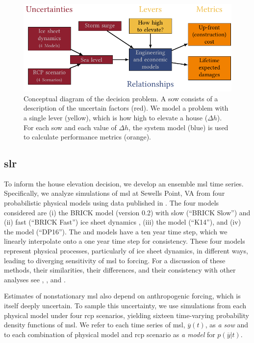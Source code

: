 \documentclass[11pt]{article}
\begin{document}
\begin{figure}
    \centering
    \includegraphics[width=\textwidth]{xlrm.pdf}
    \caption{
        Conceptual diagram of the decision problem.
        A \gls{sow} consists of a description of the uncertain factors (red).
        We model a problem with a single lever (yellow), which is how high to elevate a house ($\Delta h$).
        For each \acrshort{sow} and each value of $\Delta h$, the system model (blue) is used to calculate performance metrics (orange).
    }\label{fig:xlrm}
\end{figure}

\subsection{\gls{slr}}\label{sec:sea-level}

To inform the house elevation decision, we develop an ensemble \gls{msl} time series.
Specifically, we analyze simulations of \gls{msl} at Sewells Point, VA from four probabilistic physical models using data published in \citet{ruckert_coastal:2019}.
The four models considered are (i) the BRICK model (version 0.2) with slow (``BRICK Slow'') and (ii) fast (``BRICK Fast'') ice sheet dynamics \citep{wong_brick0.2:2017}, (iii) the \citet{kopp_probabilistic:2014} model (``K14''), and (iv) the \citet{deconto_antarctica:2016} model (``DP16'').
The \citet{kopp_probabilistic:2014} and \citet{deconto_antarctica:2016} models have a ten year time step, which we linearly interpolate onto a one year time step for consistency.
These four models represent physical processes, particularly of ice sheet dynamics, in different ways, leading to diverging sensitivity of \gls{msl} to forcing.
For a discussion of these methods, their similarities, their differences, and their consistency with other analyses see \citet{ruckert_coastal:2019}, \citet{kopp_evolving:2017}, and \citet{bamber_slrise:2019}.

Estimates of nonstationary \gls{msl} also depend on anthropogenic forcing, which is itself deeply uncertain.
To sample this uncertainty, we use simulations from each physical model under four \gls{rcp} scenarios, yielding sixteen time-varying probability density functions of \gls{msl}.
We refer to each time series of \gls{msl}, $\overline{y}(t)$, as \emph{a \acrfull{sow}} and to each combination of physical model and \gls{rcp} scenario as \emph{a model} for $p(\overline{y}|t)$.
\end{document}
